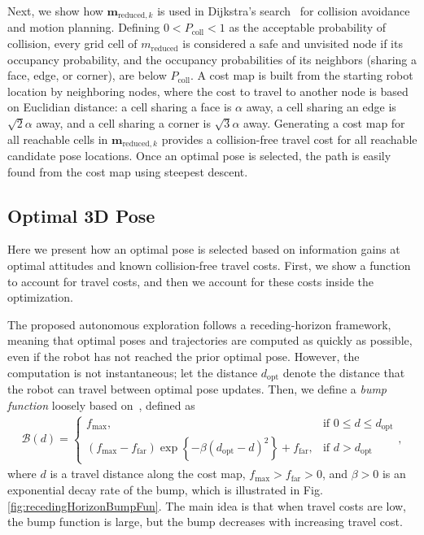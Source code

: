 \documentclass[conf]{new-aiaa}
\newcommand{\braces}[1]{\ensuremath{\left\{ #1 \right\}}}
\begin{document}
Next, we show how $\mathbf{m}_{\text{reduced},k}$ is used in Dijkstra's search~\cite{Dij59} for collision avoidance and motion planning. Defining $0<P_\text{coll}<1$ as the acceptable probability of collision, every grid cell of $ m_\text{reduced}$ is considered a safe and unvisited node if its occupancy probability, and the occupancy probabilities of its neighbors (sharing a face, edge, or corner), are below $P_\text{coll}$. A cost map is built from the starting robot location by neighboring nodes, where the cost to travel to another node is based on Euclidian distance: a cell sharing a face is $\alpha$ away, a cell sharing an edge is $\sqrt2\alpha$ away, and a cell sharing a corner is $\sqrt3\alpha$ away. Generating a cost map for all reachable cells in $\mathbf{m}_{\text{reduced},k}$ provides a collision-free travel cost for all reachable candidate pose locations. Once an optimal pose is selected, the path is easily found from the cost map using steepest descent.


\subsection{Optimal 3D Pose}

Here we present how an optimal pose is selected based on information gains at optimal attitudes and known collision-free travel costs. First, we show a function to account for travel costs, and then we account for these costs inside the optimization.

The proposed autonomous exploration follows a receding-horizon framework, meaning that optimal poses and trajectories are computed as quickly as possible, even if the robot has not reached the prior optimal pose. However, the computation is not instantaneous; let the distance $d_\text{opt}$ denote the distance that the robot can travel between optimal pose updates. Then, we define a \emph{bump function} loosely based on~\cite{Joh06}, defined as
\begin{align}
\label{eqn:BumpFunRecedingHorizon}
\mathcal B(d)=
\begin{cases}
f_\text{max},												& \text{if }0\leq d\leq d_\text{opt}
\\
(f_\text{max}-f_\text{far})\exp\braces{-\beta(d_\text{opt}-d)^2}+f_\text{far},	& \text{if }d>d_\text{opt}
\end{cases},
\end{align}
where $d$ is a travel distance along the cost map, $f_\text{max}>f_\text{far}>0$, and $\beta>0$ is an exponential decay rate of the bump, which is illustrated in Fig. \ref{fig:recedingHorizonBumpFun}. The main idea is that when travel costs are low, the bump function is large, but the bump decreases with increasing travel cost.
\end{document}
